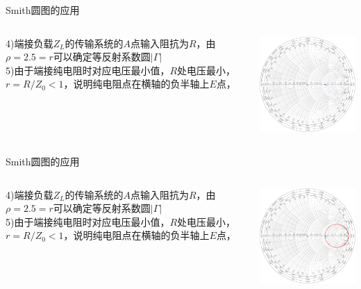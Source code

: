 \begin{frame}{Smith圆图的应用}
  \begin{columns}
    \begin{column}{0.4\linewidth}
      4)\quad 端接负载$Z_L$的传输系统的$A$点输入阻抗为$R$，由$\rho=2.5=r$可以确定等反射系数圆$\lvert\Gamma\rvert$\\
      5)\quad 由于端接纯电阻时对应电压最小值，$R$处电压最小，$r=R/Z_0<1$，说明纯电阻点在横轴的负半轴上$E$点，
    \end{column}
    \begin{column}{0.6\linewidth}
      \includegraphics[width=7cm]{Cha4//fig4-17-2.pdf}
    \end{column}
  \end{columns}
\end{frame}

\begin{frame}{Smith圆图的应用}
  \begin{columns}
    \begin{column}{0.4\linewidth}
      4)\quad 端接负载$Z_L$的传输系统的$A$点输入阻抗为$R$，由$\rho=2.5=r$可以确定等反射系数圆$\lvert\Gamma\rvert$\\
      5)\quad 由于端接纯电阻时对应电压最小值，$R$处电压最小，$r=R/Z_0<1$，说明纯电阻点在横轴的负半轴上$E$点，
    \end{column}
    \begin{column}{0.6\linewidth}
      \includegraphics[width=7cm]{Cha4//fig4-17-3.pdf}
    \end{column}
  \end{columns}
\end{frame}

